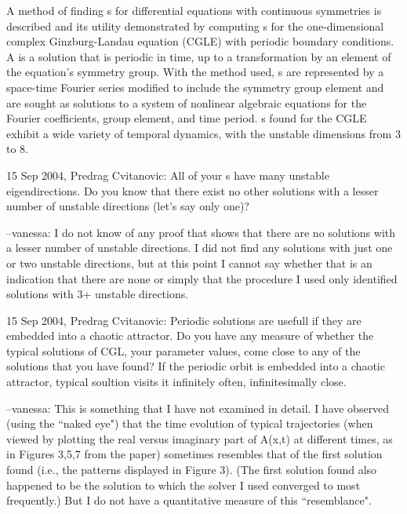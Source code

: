 
A method of finding {\rpo s} for differential equations with
continuous symmetries is described and its utility demonstrated by computing
{\rpo s} for the one-dimensional complex Ginzburg-Landau
equation (CGLE) with periodic boundary conditions.  A {\rpo} is
a solution that is periodic in time, up to a transformation by an element of the
equation's symmetry group.  With the method used, {\rpo s} are
represented by a space-time Fourier series modified to include the symmetry
group element and are sought as solutions to a system of nonlinear algebraic
equations for the Fourier coefficients, group element, and time period.
{\Rpo s} found for the CGLE exhibit a wide variety of temporal
dynamics,
with the %
unstable dimensions from 3 to 8.

15 Sep 2004, Predrag Cvitanovic:
All of your {\Rpo s} have many unstable
eigendirections. Do you know that there exist no other solutions with a
lesser number of unstable directions (let's say only one)?

--vanessa:
I do not know of any proof that shows that there are no solutions with a
lesser number of unstable directions.  I did not find any solutions with
just one or two unstable directions, but at this point I cannot say
whether that is an indication that there are none or simply that
the procedure I used only identified solutions with 3+ unstable
directions.

15 Sep 2004, Predrag Cvitanovic:
Periodic solutions are usefull if they are embedded into a chaotic
attractor. Do you have any measure of whether the typical solutions of
CGL, your parameter values, come close to any of the solutions that you
have found? If the periodic orbit is embedded into a chaotic attractor,
typical soultion visits it infinitely often, infinitesimally close.

--vanessa:
This is something that I have not examined in detail.  I have observed (using
the ``naked eye") that the time evolution of typical trajectories (when viewed
by plotting the real versus imaginary part of A(x,t) at different times, as in
Figures 3,5,7 from the paper) sometimes resembles that of the first solution
found (i.e., the patterns displayed in Figure 3). (The first solution
found also happened to be the solution to which the solver I used
converged to most frequently.)  But I do not have a
quantitative measure of this ``resemblance".

